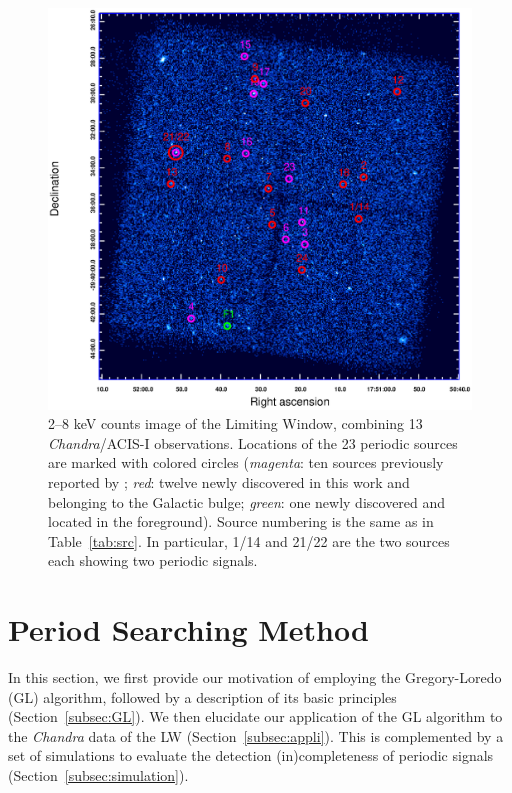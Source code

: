 \documentclass[fleqn,usenatbib]{mnras}
\begin{document}
\begin{figure}
\centering
\includegraphics[scale=0.8]{./figure/LW/ds9.eps}
\caption{2--8 keV counts image of the Limiting Window, combining 13 {\it Chandra}/ACIS-I observations. Locations of the 23 periodic sources are marked with colored circles ({\it magenta}: ten sources previously reported by \citep{2012ApJ...746..165H}; {\it red}: twelve newly discovered in this work and belonging to the Galactic bulge; {\it green}: one newly discovered and located in the foreground). Source numbering is the same as in Table~\ref{tab:src}. In particular, 1/14 and 21/22 are the two sources each showing two periodic signals.}
\label{fig:FoV}
\end{figure}

\section{Period Searching Method}\label{sec:methods}
In this section, we first provide our motivation of employing the Gregory-Loredo (GL) algorithm, followed by a description of its basic principles (Section~\ref{subsec:GL}). We then elucidate our application of the GL algorithm to the {\it Chandra} data of the LW (Section~\ref{subsec:appli}). This is complemented by a set of simulations to evaluate the detection (in)completeness of periodic signals (Section~\ref{subsec:simulation}).  
\end{document}
